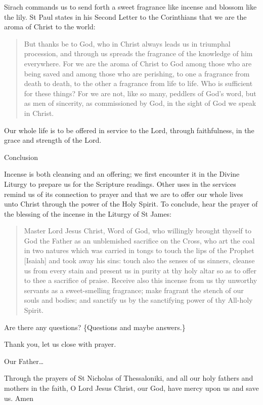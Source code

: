 \documentclass[
]{article}
\newcommand{\RL}[1]{\beginR #1\endR}
\begin{document}
Sirach commands us to send forth a sweet fragrance like incense and
blossom like the lily. St Paul states in his Second Letter to the
Corinthians that we are the aroma of Christ to the world:

\begin{quote}
But thanks be to God, who in Christ always leads us in triumphal
procession, and through us spreads the fragrance of the knowledge of him
everywhere. For we are the aroma of Christ to God among those who are
being saved and among those who are perishing, to one a fragrance from
death to death, to the other a fragrance from life to life. Who is
sufficient for these things? For we are not, like so many, peddlers of
God\RL{'}s word, but as men of sincerity, as commissioned by God, in the
sight of God we speak in Christ.
\end{quote}

Our whole life is to be offered in service to the Lord, through
faithfulness, in the grace and strength of the Lord.

Conclusion

Incense is both cleansing and an offering; we first encounter it in the
Divine Liturgy to prepare us for the Scripture readings. Other uses in
the services remind us of its connection to prayer and that we are to
offer our whole lives unto Christ through the power of the Holy Spirit.
To conclude, hear the prayer of the blessing of the incense in the
Liturgy of St James:

\begin{quote}
Master Lord Jesus Christ, Word of God, who willingly brought thyself to
God the Father as an unblemished sacrifice on the Cross, who art the
coal in two natures which was carried in tongs to touch the lips of the
Prophet {[}Isaiah{]} and took away his sins: touch also the senses of us
sinners, cleanse us from every stain and present us in purity at thy
holy altar so as to offer to thee a sacrifice of praise. Receive also
this incense from us thy unworthy servants as a sweet-smelling
fragrance; make fragrant the stench of our souls and bodies; and
sanctify us by the sanctifying power of thy All-holy Spirit.
\end{quote}

Are there any questions? \{Questions and maybe answers.\}

Thank you, let us close with prayer.

Our Father\ldots{}

Through the prayers of St Nicholas of Thessaloniki, and all our holy
fathers and mothers in the faith, O Lord Jesus Christ, our God, have
mercy upon us and save us. Amen
\end{document}
